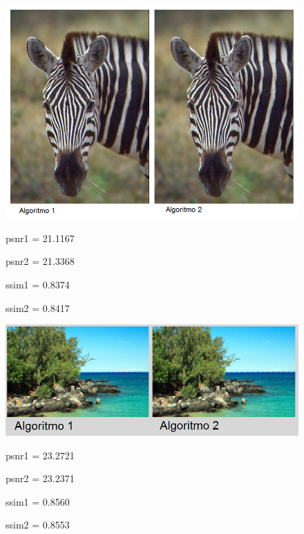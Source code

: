 \documentclass[a4paper]{article}
\begin{document}
\newpage
\begin{figure}[h!]
	\caption{}
	\begin{center}
	\includegraphics[scale=0.60]{imagenes/Vecino/zebra}
	\label{Zebra}
	
	psnr1 =   21.1167

psnr2 =   21.3368

ssim1 =    0.8374

ssim2 =    0.8417
  \end{center}
\end{figure}


\begin{figure}[h!]
	\caption{}
	\begin{center}
	\includegraphics[scale=0.06]{imagenes/Vecino/hawaiicmp}
	\label{Zebra}
	
	psnr1 =   23.2721

psnr2 =   23.2371

ssim1 =    0.8560

ssim2 =    0.8553
  \end{center}
\end{figure}

\newpage
\end{document}
